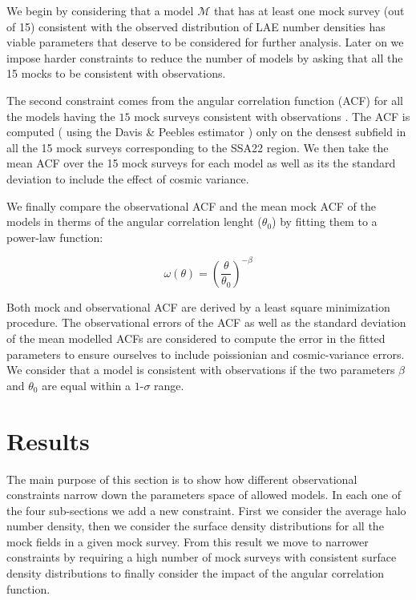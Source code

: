 \documentclass[usenatbib]{mn2e}
\begin{document}
We begin by considering that  a model ${\mathcal M}$ that has at least
one mock survey (out of 15) consistent with the observed
distribution of LAE number densities has viable parameters that
deserve to be considered for further analysis. Later on we impose
harder constraints to reduce the number of models by asking that all
the 15 mocks to be consistent with observations.

The second constraint  comes from the angular correlation function (ACF)
for all the models having the $15$ mock surveys consistent with
observations . The ACF is computed  ( using 
the Davis \& Peebles  estimator \citep{Davis1983} ) only on the densest
subfield in all the 15 mock surveys corresponding to the SSA22
region. We then take the mean ACF over the 15  mock surveys  for
each model as well as its the standard deviation to include
the effect of cosmic variance. 

We finally compare the observational ACF and the mean mock  ACF of the models   
in therms of the angular correlation lenght ($\theta_{0}$) by fitting 
them to a power-law function:  

\begin{equation}
\omega(\theta) = \left(\frac{\theta}{\theta_{0}}\right)^{-\beta}
\label{eq:fitting}
\end{equation}

Both mock and observational ACF are derived by a least
square minimization procedure. The observational errors of 
the ACF as well as the standard deviation of the mean modelled ACFs  are
considered to compute the error in the fitted parameters to ensure ourselves
to include poissionian and cosmic-variance errors. 
We consider that a model is consistent with observations if the two
parameters $\beta$ and $\theta_0$ are equal within a $1$-$\sigma$ range. 



 
\section{Results}
\label{sec:results}

The main purpose of this section is to show how different
observational constraints narrow down the parameters space of allowed
models. In each one of the four sub-sections we add a new
constraint. First we consider the average halo number density, then we
consider the surface density distributions for all the mock fields in
a given mock survey. From this result we move to narrower constraints
by requiring a high number of mock surveys with consistent surface
density distributions to finally consider the impact of the angular
correlation function. 
\end{document}
